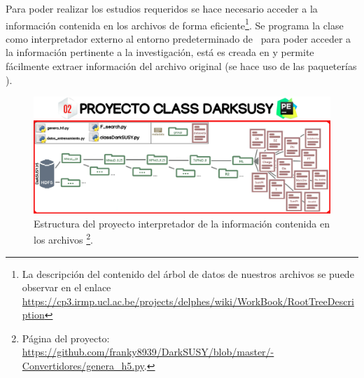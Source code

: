 

Para poder realizar los estudios requeridos se hace necesario acceder a la información contenida en los archivos  de forma eficiente\footnote{La descripción del contenido del árbol de datos de nuestros archivos se puede observar en el enlace \href{https://cp3.irmp.ucl.ac.be/projects/delphes/wiki/WorkBook/RootTreeDescription}{https://\-cp3.\-irmp.\-ucl.\-ac.\-be/\-pro\-jects/\-delphes/\-wiki/\-Work\-Book/\-Root\-Tree\-Des\-crip\-tion}}. Se programa la clase  como interpretador externo al entorno predeterminado de \ROOT ~para poder acceder a la información pertinente a la investigación, está es creada en  y permite fácilmente extraer información del archivo original  (se hace uso de las paqueterías ). %

\begin{figure}[!h]
\centering
\includegraphics[width=1\textwidth]{Cap3/imagenes/class_darksusy.png}
\caption[Estructura del proyecto interpretador de la información contenida en los archivos .]{Estructura del proyecto interpretador de la información contenida en los archivos \footnote{Página del proyecto: \href{https://github.com/franky8939/DarkSUSY/blob/master/00-Convertidores/genera_h5.py}{https://github.com/franky8939/\-Dark\-SUSY/\-blob/\-mas\-ter/-\-Con\-ver\-ti\-do\-res/\-ge\-ne\-ra\_h5.\-py}.}. }
\label{class_darksusy1}
\end{figure}

